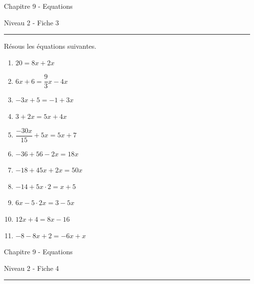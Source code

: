 \documentclass[12pt,parskip=half-, twoside=semi]{scrartcl}
\begin{document}
\newpage

\begin{center}
    \bfseries
    \begin{Huge}
      Chapitre 9 - Equations
    \end{Huge}
    \smallbreak
    \begin{large}
      Niveau 2  - Fiche 3
    \end{large}
    \smallbreak
    \rule[10pt]{.5\linewidth}{1 pt}
  \end{center}
  \setcounter{exercise}{0}

\begin{exercise}
    Résous les équations suivantes.
    \begin{enumerate}[itemsep=0.4cm]
      \item \( 20 = 8x + 2x \)
      \item \( 6x +6 = \dfrac{9}{3}x-4x \)
      \item \( - 3x + 5 = - 1 +3x \)
      \item \( 3 + 2x = 5x + 4x\)
      \item \(\dfrac{-30x}{15}+5x=5x+7\)
      \item \(-36+56-2x=18x\)
      \item \(-18+45x+2x=50x\)
      \item \(-14+5x\cdot 2=x+5\)
      \item \(6x - 5\cdot 2x=3-5x\)
      \item \(12x+4=8x-16\)
      \item \(-8-8x+2=-6x+x\)
    \end{enumerate}
\end{exercise}


\newpage


\begin{center}
    \bfseries
    \begin{Huge}
      Chapitre 9 - Equations
    \end{Huge}
    \smallbreak
    \begin{large}
      Niveau 2  - Fiche 4
    \end{large}
    \smallbreak
    \rule[10pt]{.5\linewidth}{1 pt}
  \end{center}
  \setcounter{exercise}{0}
\end{document}
